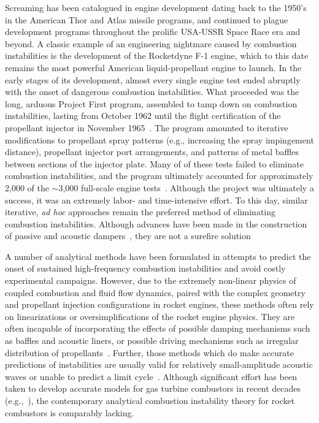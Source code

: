 Screaming has been catalogued in engine development dating back to the 1950's in the American Thor and Atlas missile programs, and continued to plague development programs throughout the prolific USA-USSR Space Race era and beyond. A classic example of an engineering nightmare caused by combustion instabilities is the development of the Rocketdyne F-1 engine, which to this date remains the most powerful American liquid-propellant engine to launch. In the early stages of its development, almost every single engine test ended abruptly with the onset of dangerous combustion instabilities. What proceeded was the long, arduous Project First program, assembled to tamp down on combustion instabilities, lasting from October 1962 until the flight certification of the propellant injector in November 1965~\cite{Young2008}. The program amounted to iterative modifications to propellant spray patterns (e.g., increasing the spray impingement distance), propellant injector port arrangements, and patterns of metal baffles between sections of the injector plate. Many of of these tests failed to eliminate combustion instabilities, and the program ultimately accounted for approximately 2,000 of the $\sim$3,000 full-scale engine tests~\cite{Oefelein1993}. Although the project was ultimately a success, it was an extremely labor- and time-intensive effort. To this day, similar iterative, \textit{ad hoc} approaches remain the preferred method of eliminating combustion instabilities. Although advances have been made in the construction of passive and acoustic dampers~\cite{Zhao2015}, they are not a surefire solution

A number of analytical methods have been formulated in attempts to predict the onset of sustained high-frequency combustion instabilities and avoid costly experimental campaigns. However, due to the extremely non-linear physics of coupled combustion and fluid flow dynamics, paired with the complex geometry and propellant injection configurations in rocket engines, these methods often rely on linearizations or oversimplifications of the rocket engine physics. They are often incapable of incorporating the effects of possible damping mechanisms such as baffles and acoustic liners, or possible driving mechanisms such as irregular distribution of propellants~\cite{Yang1995}. Further, those methods which do make accurate predictions of instabilities are usually valid for relatively small-amplitude acoustic waves or unable to predict a limit cycle~\cite{Culick1994}. Although significant effort has been taken to develop accurate models for gas turbine combustors in recent decades (e.g.,~\cite{Noiray2008}), the contemporary analytical combustion instability theory for rocket combustors is comparably lacking.

